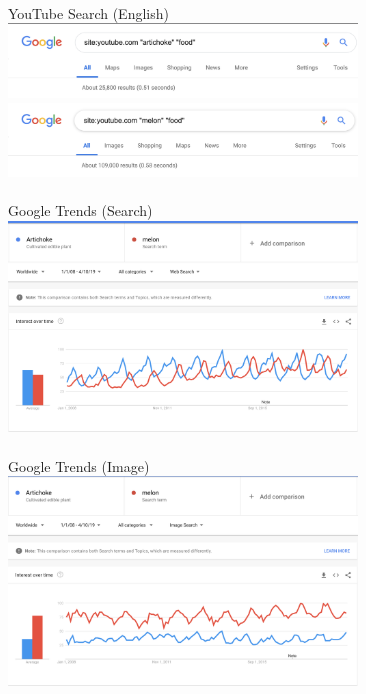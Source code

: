 \documentclass[11pt, oneside,a4paper]{article}
\begin{document}
        \vspace{1.5 cm}
        
        \paragraph{}
        \noindent YouTube Search (English) \\
        \includegraphics[width=350px]{youtube/artichoke.png}\\
        \includegraphics[width=350px]{youtube/melon.png}

        \vspace{1.5 cm}


        \paragraph{}
        \noindent Google Trends (Search) \\
        \includegraphics[width=350px]{google_trends/google.png}

        \vspace{1.5 cm}

        \paragraph{}
        \noindent Google Trends (Image) \\
        \includegraphics[width=350px]{trends/image.png}
\end{document}
